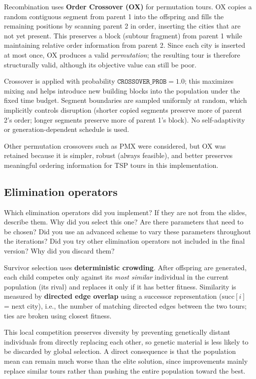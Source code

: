 \documentclass[a4paper,10pt]{article}
\newcommand{\ReplaceMe}[1]{{\color{blue}#1}}
\begin{document}
Recombination uses \textbf{Order Crossover (OX)} for permutation tours. OX copies a random contiguous segment
from parent 1 into the offspring and fills the remaining positions by scanning parent 2 in order, inserting the
cities that are not yet present. This preserves a block (subtour fragment) from parent 1 while maintaining
relative order information from parent 2. Since each city is inserted at most once, OX produces a valid
\emph{permutation}; the resulting tour is therefore structurally valid, although its objective value can still be
poor.

Crossover is applied with probability $\texttt{CROSSOVER\_PROB}=1.0$; this maximizes mixing and helps introduce
new building blocks into the population under the fixed time budget. Segment boundaries are sampled uniformly
at random, which implicitly controls disruption (shorter copied segments preserve more of parent 2's order;
longer segments preserve more of parent 1's block). No self-adaptivity or generation-dependent schedule is used.

Other permutation crossovers such as PMX were considered, but OX was retained because it is simpler, robust
(always feasible), and better preserves meaningful ordering information for TSP tours in this implementation.


\subsection{Elimination operators}

\ReplaceMe{Which elimination operators did you implement? If they are not from the slides, describe them. Why did you select this one? Are there parameters that need to be chosen? Did you use an advanced scheme to vary these parameters throughout the iterations? Did you try other elimination operators not included in the final version? Why did you discard them?} 


Survivor selection uses \textbf{deterministic crowding}. After offspring are generated, each child competes only
against its \emph{most similar} individual in the current population (its rival) and replaces it only if it has
better fitness. Similarity is measured by \textbf{directed edge overlap} using a successor representation
($\mathrm{succ}[i]$ = next city), i.e., the number of matching directed edges between the two tours; ties are
broken using closest fitness.

This local competition preserves diversity by preventing genetically distant individuals from directly replacing
each other, so genetic material is less likely to be discarded by global selection. A direct consequence is that
the population mean can remain much worse than the elite solution, since improvements mainly replace similar
tours rather than pushing the entire population toward the best.
\end{document}
